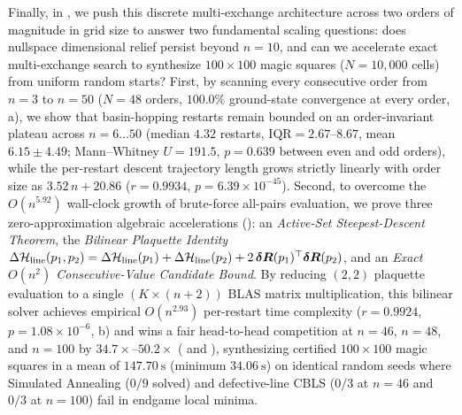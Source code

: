 Finally, in , we push this discrete multi-exchange architecture across two orders of magnitude in grid size to answer two fundamental scaling questions: does nullspace dimensional relief persist beyond $n = 10$, and can we accelerate exact multi-exchange search to synthesize $100\times 100$ magic squares ($N = 10{,}000$ cells) from uniform random starts? First, by scanning every consecutive order from $n = 3$ to $n = 50$ ($N = 48$ orders, $100.0\%$ ground-state convergence at every order, a), we show that basin-hopping restarts remain bounded on an order-invariant plateau across $n = 6\dots 50$ (median $4.32$ restarts, $\text{IQR} = 2.67\text{--}8.67$, mean $6.15 \pm 4.49$; Mann--Whitney $U = 191.5$, $p = 0.639$ between even and odd orders), while the per-restart descent trajectory length grows strictly linearly with order size as $3.52\,n + 20.86$ ($r = 0.9934$, $p = 6.39\times 10^{-45}$). Second, to overcome the $O(n^{5.92})$ wall-clock growth of brute-force all-pairs evaluation, we prove three zero-approximation algebraic accelerations (): an \emph{Active-Set Steepest-Descent Theorem}, the \emph{Bilinear Plaquette Identity} $\Delta\mathcal{H}_{\mathrm{line}}(p_1, p_2) = \Delta\mathcal{H}_{\mathrm{line}}(p_1) + \Delta\mathcal{H}_{\mathrm{line}}(p_2) + 2\,\boldsymbol{\delta R}(p_1)^\top \boldsymbol{\delta R}(p_2)$, and an \emph{Exact $O(n^2)$ Consecutive-Value Candidate Bound}. By reducing $(2,2)$ plaquette evaluation to a single $(K \times (n+2))$ BLAS matrix multiplication, this bilinear solver achieves empirical $O(n^{2.93})$ per-restart time complexity ($r = 0.9924$, $p = 1.08\times 10^{-6}$, b) and wins a fair head-to-head competition at $n = 46$, $n = 48$, and $n = 100$ by $34.7\times\text{--}50.2\times$ ( and ), synthesizing certified $100\times 100$ magic squares in a mean of $147.70~\text{s}$ (minimum $34.06~\text{s}$) on identical random seeds where Simulated Annealing ($0/9$ solved) and defective-line CBLS ($0/3$ at $n=46$ and $0/3$ at $n=100$) fail in endgame local minima.
